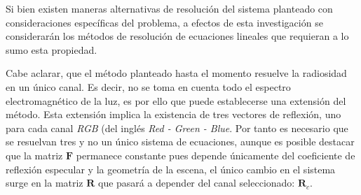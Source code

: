 Si bien existen maneras alternativas de resolución del sistema planteado con consideraciones específicas del problema, a efectos de esta investigación se considerarán los métodos de resolución de ecuaciones lineales que requieran a lo sumo esta propiedad.

Cabe aclarar, que el método planteado hasta el momento resuelve la radiosidad en un único canal. Es decir, no se toma en cuenta todo el espectro electromagnético de la luz, es por ello que puede establecerse una extensión del método. Esta extensión implica la existencia de tres vectores de reflexión, uno para cada canal \textit{RGB} (del inglés \textit{Red - Green - Blue}. Por tanto es necesario que se resuelvan tres y no un único sistema de ecuaciones, aunque es posible destacar que la matriz $\mathbf{F}$ permanece constante pues depende únicamente del coeficiente de reflexión especular y la geometría de la escena, el único cambio en el sistema surge en la matriz $\mathbf{R}$ que pasará a depender del canal seleccionado: $\mathbf{R}_{c}$.